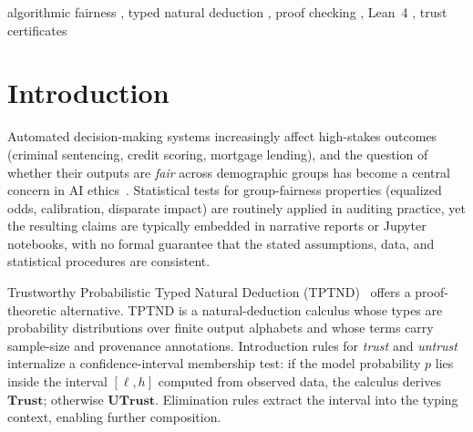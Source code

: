 \documentclass{ceurart}
\newcommand{\Trust}{\textbf{Trust}}
\newcommand{\UTrust}{\textbf{UTrust}}
\begin{document}
\begin{keywords}
algorithmic fairness \sep
typed natural deduction \sep
proof checking \sep
Lean~4 \sep
trust certificates
\end{keywords}

\maketitle

\section{Introduction}\label{sec:intro}

Automated decision-making systems increasingly affect high-stakes
outcomes (criminal sentencing, credit scoring, mortgage lending),
and the question of whether their outputs are \emph{fair} across
demographic groups has become a central concern in AI
ethics~\cite{barocas2019fairness}.
Statistical tests for group-fairness properties (equalized odds,
calibration, disparate impact) are routinely applied in auditing
practice, yet the resulting claims are typically embedded in
narrative reports or Jupyter notebooks, with no formal guarantee
that the stated assumptions, data, and statistical procedures
are consistent.

Trustworthy Probabilistic Typed Natural Deduction
(TPTND)~\cite{dasaro2025tptnd} offers a proof-theoretic alternative.
TPTND is a natural-deduction calculus whose types are probability
distributions over finite output alphabets and whose terms carry
sample-size and provenance annotations.
Introduction rules for \emph{trust} and \emph{untrust} internalize
a confidence-interval membership test: if the model probability $p$
lies inside the interval $[\ell,h]$ computed from observed data, the
calculus derives $\Trust$; otherwise $\UTrust$.
Elimination rules extract the interval into the typing context,
enabling further composition.
\end{document}
